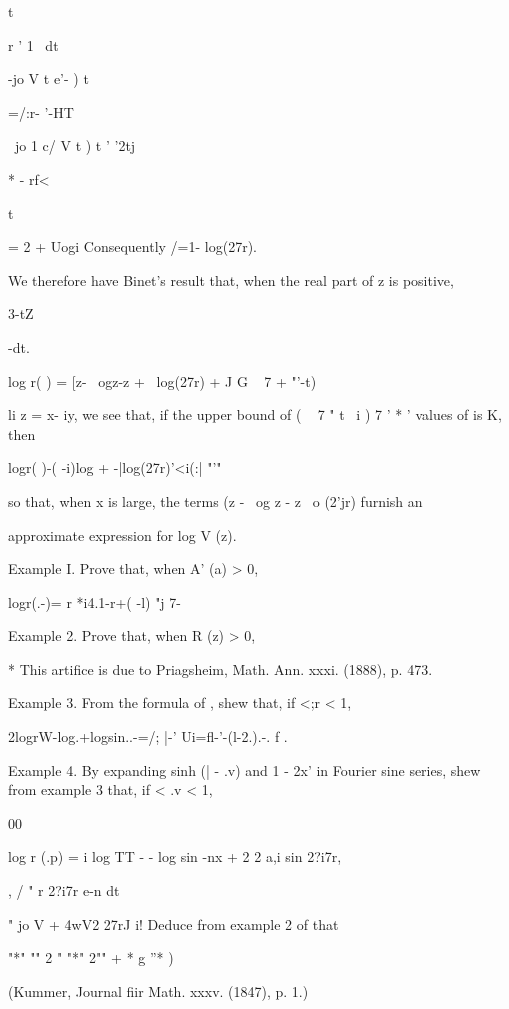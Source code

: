 t

r ' 1 \ dt

-jo V t e'- ) t

=/:r- '-HT

~jo 1 c/ V t ) t ' '2tj

* - rf<

t

= 2 + Uogi Consequently /=1- log(27r).

We therefore have Binet's result that, when the real part of z is
positive,

3-tZ

 -dt.

log r( ) = [z- \ ogz-z + \ log(27r) + J G ~ 7 + "'-t)

li z = x- iy, we see that, if the upper bound of ( ~ 7 " t \ i ) 7 ' *
' values of is K, then

logr( )-( -i)log + -|log(27r)'<i(:| "'"

so that, when x is large, the terms (z - \ og z - z \ o (2'jr) furnish
an

approximate expression for log V (z).

Example I. Prove that, when A' (a) > 0,

logr(.-)= r *i4.1-r+( -l) "j 7- 

Example 2. Prove that, when R (z) > 0,

* This artifice is due to Priagsheim, Math. Ann. xxxi. (1888), p. 473.

%
%

Example 3. From the formula of , shew that, if <;r < 1,

2logrW-log.+logsin..-=/; |-' Ui=fl-'-(l-2.).-. f .


Example 4. By expanding sinh (| - .v) and 1 - 2x' in Fourier sine
series, shew from example 3 that, if < .v < 1,

00

log r (.p) = i log TT - - log sin -nx + 2 2 a,i sin 2?i7r,

, / " r 2?i7r e-n dt

" jo V + 4wV2 27rJ i! Deduce from example 2 of  that

"*" "" 2 " "*" 2"" + * g ''* )

(Kummer, Journal fiir Math. xxxv. (1847), p. 1.)


